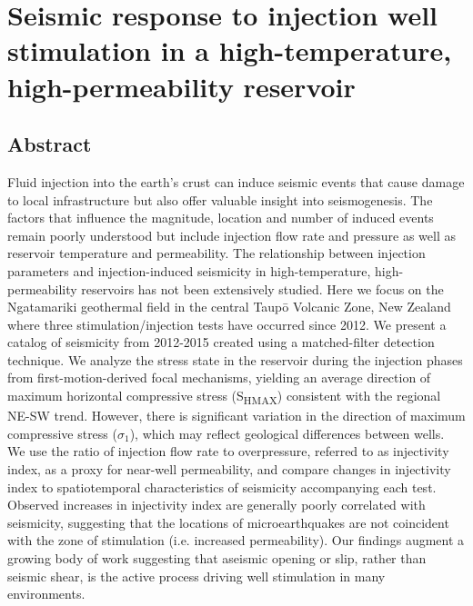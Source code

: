 \chapter[Seismic response to injection well stimulation in a high-temperature,
high-permeability reservoir]{Seismic response to injection well \\ stimulation in a high-temperature,
\\high-permeability reservoir}

\section*{Abstract}
Fluid injection into the earth's crust can induce seismic events that
cause damage to local infrastructure but also offer valuable insight
into seismogenesis. The factors that influence the magnitude, location
and number of induced events remain poorly understood but include
injection flow rate and pressure as well as reservoir temperature and
permeability. The relationship between injection parameters and
injection-induced seismicity in high-temperature, high-permeability
reservoirs has not been extensively studied. Here we focus on the
Ngatamariki geothermal field in the central Taup\={o} Volcanic Zone, New
Zealand where three stimulation\slash{injection} tests have occurred since
2012. We present a catalog of seismicity from 2012-2015 created using a
matched-filter detection technique. We analyze the stress state in the
reservoir during the injection phases from first-motion-derived focal
mechanisms, yielding an average direction of maximum horizontal
compressive stress (S\textsubscript{HMAX}) consistent with the regional
NE-SW trend. However, there is significant variation in the direction of
maximum compressive stress (\(\sigma_{1}\)), which may reflect
geological differences between wells. We use the ratio of injection flow
rate to overpressure, referred to as injectivity index, as a proxy for
near-well permeability, and compare changes in injectivity index to
spatiotemporal characteristics of seismicity accompanying each test.
Observed increases in injectivity index are generally poorly correlated
with seismicity, suggesting that the locations of microearthquakes are
not coincident with the zone of stimulation (i.e. increased
permeability). Our findings augment a growing body of work suggesting
that aseismic opening or slip, rather than seismic shear, is the active
process driving well stimulation in many environments.

